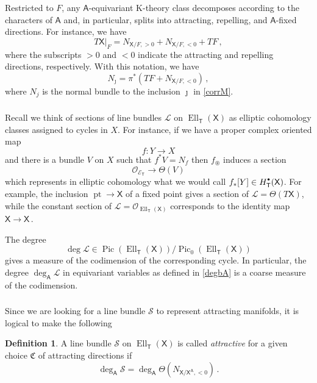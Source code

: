 \documentclass[14pt]{extarticle}
\newcommand{\bT}{\mathsf{T}}
\newcommand{\bA}{\mathsf{A}}
\newcommand{\bX}{\mathsf{X}}
\newcommand{\cL}{\mathscr{L}}
\newcommand{\cE}{\mathscr{E}}
\newcommand{\fC}{\mathfrak{C}}
\newcommand{\cS}{\mathscr{S}}
\newcommand{\cO}{\mathscr{O}}
\newcommand{\Hd}{{H}^{\raisebox{0.5mm}{$\scriptscriptstyle \bullet$}}}
\newcommand{\ppf}{{\circledast}}
\newcommand{\pf}{_{\ppf}}
\DeclareMathOperator{\Ell}{Ell}
\DeclareMathOperator{\pt}{pt}
\DeclareMathOperator{\Pic}{Pic}
\theoremstyle{definition}
\newtheorem{Definition}{Definition}
\begin{document}
  Restricted to $F$, any $\bA$-equivariant K-theory class decomposes
according to the characters of $\bA$ and, in particular, splits into
attracting, repelling, and $\bA$-fixed directions. For instance, we have
%
\begin{equation}
  \label{TXsplit}
  T\bX\big|_{F} = N_{\bX/F,>0} + N_{\bX/F,<0} +T F \,, 
\end{equation}
%
where the subscripts $>0$ and $<0$ indicate the attracting and
repelling directions, respectively. With this notation, we have
%
\begin{equation}
 N_\jmath = \pi^*( TF + N_{\bX/F,<0})  \,,\label{Nj}
 \end{equation}
%
 where $N_j$ is the normal bundle to the inclusion $\jmath$ in
 \eqref{corrM}. 

 \subsubsection{}

 Recall we think of  sections of line bundles $\cL$ on $\Ell_\bT(\bX)$ as
 elliptic cohomology classes assigned to cycles in $X$. For instance,
 if we have a proper complex oriented map
 $$
 f: Y \to X 
 $$
 and there is a bundle $V$ on $X$ such
 that $f^*V = N_{f}$ then $f\pf$ induces a section
 $$
 \cO_{\cE_\bT} \to \Theta(V) 
 $$ 
 which represents in elliptic cohomology what we would call $f_*[Y]
 \in \Hd_\bT(\bX)$. For example, the inclusion $\pt \to \bX$ of a
 fixed point gives a section of
 $\cL=\Theta(T\bX)$, while the constant section of $\cL=\cO_{\Ell_\bT(\bX)}$
 corresponds to the identity map $\bX \to \bX$\,. 

 The degree
 $$
 \deg \cL \in \Pic(\Ell_\bT(\bX)) \big/ \Pic_0(\Ell_\bT(\bX))
 $$
 gives a measure of the codimension of the corresponding cycle. In
 particular, the degree $\deg_\bA \cL$ in equivariant variables
 as defined in \eqref{degbA} is a coarse measure of the
 codimension. 

 \subsubsection{}
 Since we are looking for a line bundle $\cS$ to represent attracting
 manifolds, it is logical to make the following

 \begin{Definition}\label{d_attr}
  A line bundle $\cS$ on $\Ell_\bT(\bX)$ is called \emph{attractive} for a
  given choice $\fC$ of attracting directions if
  \begin{equation}
  \deg_\bA \cS = \deg_\bA \Theta(N_{\bX/\bX^\bA,<0}) \,.
\label{dattr}
\end{equation}%
\end{Definition}
\end{document}
